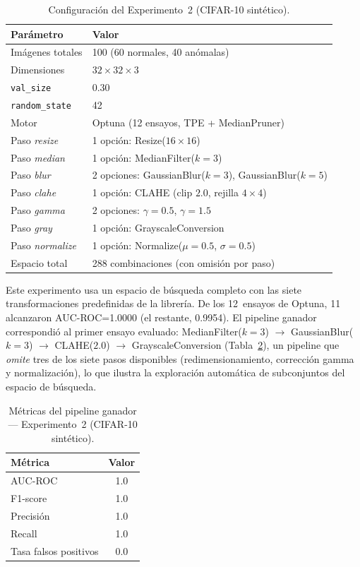 \documentclass[conference,spanish]{IEEEtran}
\begin{document}
\begin{table}[t]
\centering
\renewcommand{\arraystretch}{1.2}
\caption{Configuración del Experimento~2 (CIFAR-10 sintético).}
\label{tab:espacio_exp2}
\begin{tabular}{@{}ll@{}}
\toprule
\textbf{Parámetro} & \textbf{Valor} \\
\midrule
Imágenes totales    & 100 (60 normales, 40 anómalas) \\
Dimensiones         & $32\times32\times3$ \\
\texttt{val\_size}  & 0.30 \\
\texttt{random\_state} & 42 \\
Motor               & Optuna (12 ensayos, TPE + MedianPruner) \\
Paso \emph{resize}  & 1 opción: Resize($16\times16$) \\
Paso \emph{median}  & 1 opción: MedianFilter($k=3$) \\
Paso \emph{blur}    & 2 opciones: GaussianBlur($k=3$), GaussianBlur($k=5$) \\
Paso \emph{clahe}   & 1 opción: CLAHE (clip $2.0$, rejilla $4\times4$) \\
Paso \emph{gamma}   & 2 opciones: $\gamma=0.5$, $\gamma=1.5$ \\
Paso \emph{gray}    & 1 opción: GrayscaleConversion \\
Paso \emph{normalize} & 1 opción: Normalize($\mu=0.5$, $\sigma=0.5$) \\
Espacio total       & 288 combinaciones (con omisión por paso) \\
\bottomrule
\end{tabular}
\end{table}

Este experimento usa un espacio de búsqueda completo con las siete
transformaciones predefinidas de la librería. De los 12~ensayos de Optuna,
11 alcanzaron AUC-ROC=1.0000 (el restante, 0.9954). El pipeline ganador
correspondió al primer ensayo evaluado: MedianFilter($k=3$) $\to$
GaussianBlur($k=3$) $\to$ CLAHE($2.0$) $\to$ GrayscaleConversion
(Tabla~\ref{tab:metricas_exp2}), un pipeline que \emph{omite} tres de los
siete pasos disponibles (redimensionamiento, corrección gamma y
normalización), lo que ilustra la exploración automática de subconjuntos
del espacio de búsqueda.

\begin{table}[t]
\centering
\renewcommand{\arraystretch}{1.2}
\caption{Métricas del pipeline ganador — Experimento~2 (CIFAR-10 sintético).}
\label{tab:metricas_exp2}
\begin{tabular}{@{}lc@{}}
\toprule
\textbf{Métrica} & \textbf{Valor} \\
\midrule
AUC-ROC              & 1.0 \\
F1-score             & 1.0 \\
Precisión            & 1.0 \\
Recall               & 1.0 \\
Tasa falsos positivos& 0.0 \\
\bottomrule
\end{tabular}
\end{table}
\end{document}
